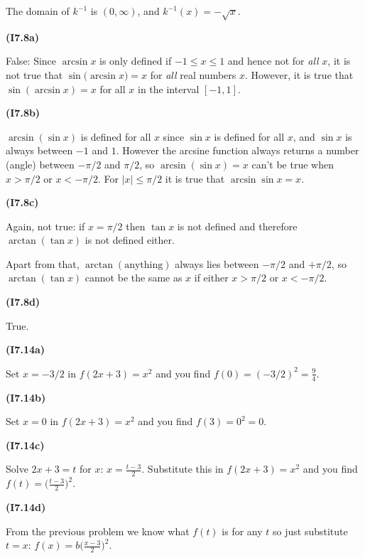 \documentclass[openany,reqno]{amsbook}
\begin{document}
\begin{trivlist}
  The domain of $k^{-1} $ is $(0, \infty)$, and $k^{-1}(x) = -\sqrt{x}$.
  \bigskip

\item[{\bf(I7.8a)}]

  False: Since $\arcsin x$ is only defined if $-1\leq x\leq 1$ and hence
  not for \emph{all} $x$, it is not true that $\sin\bigl(\arcsin
  x\bigr) = x$ for \emph{all} real numbers $x$.
  However, it is true that $\sin(\arcsin x) = x$ for all $x$ in
  the interval $[-1,1]$.
  \bigskip

\item[{\bf(I7.8b)}]

  $\arcsin(\sin x)$ is defined for all $x$ since $\sin x$ is
  defined for all $x$, and $\sin x$ is always between $-1$ and $1$.
  However the arcsine function always returns a number (angle) between
  $-\pi/2$ and $\pi/2$, so $\arcsin( \sin x) = x$ can't be true when
  $x>\pi/2$ or $x<-\pi/2$.  For $|x|\leq \pi/2$ it is true that $\arcsin
  \sin x = x$.
  \bigskip

\item[{\bf(I7.8c)}]

  Again, not true: if $x=\pi/2$ then $\tan x$ is not defined and therefore
  $\arctan(\tan x)$ is not defined either.

  Apart from that, $\arctan (\text{anything})$ always lies
  between $-\pi/2 $ and $+\pi/2$, so $\arctan(\tan x)$ cannot
  be the same as $x$ if either $x>\pi/2$ or $x<-\pi/2$.
  \bigskip

\item[{\bf(I7.8d)}]

  True.
  \bigskip

\item[{\bf(I7.14a)}]

  Set $x=-3/2$ in $f(2x+3) = x^2$ and you find $f(0) = (-3/2)^2 =
  \frac{9}{4}$.
  \bigskip

\item[{\bf(I7.14b)}]

  Set $x=0$ in $f(2x+3) = x^2$ and you find $f(3) = 0^2 = 0$.
  \bigskip

\item[{\bf(I7.14c)}]

  Solve $2x+3 = t$ for $x$:  $x=\frac{t-3}{2}$.  Substitute this in $f(2x+3) =
  x^2$ and you find $f(t) = \bigl(\frac{t-3}{2}\bigr)^2$.
  \bigskip

\item[{\bf(I7.14d)}]

  From the previous problem we know what $f(t)$ is for any $t$ so just substitute $t=x$:
  $f(x)= b\bigl(\frac{x-3}{2}\bigr)^2$.


\end{trivlist}
\end{document}
